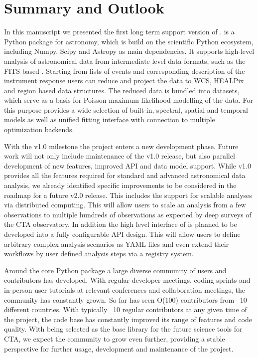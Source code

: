 \section{Summary and Outlook}
\label{sec:summary-and-outlook}

In this manuscript we presented the first long term support  version of \gammapy.
\gammapy is a Python package for \gammaray astronomy, which is build on the
scientific Python ecosystem, including Numpy, Scipy and Astropy as
main dependencies. It supports high-level analysis of astronomical \gammaray
data from intermediate level data formats, such as the FITS based
\gadf. Starting from lists of \gammaray events and corresponding description
of the instrument response users can reduce and project the data
to WCS, HEALPix and region based data structures. The reduced data is bundled
into datasets, which serve as a basis for Poisson maximum likelihood
modelling of the data. For this purpose \gammapy provides a wide selection
of built-in, spectral, spatial and temporal models as well as unified
fitting interface with connection to multiple optimization backends.

With the v1.0 milestone the \gammapy project enters a new development
phase. Future work will not only include maintenance of the v1.0 release,
but also parallel development of new features, improved API and data
model support. While v1.0 provides all the features required for
standard and advanced astronomical \gammaray data analysis,
we already identified specific improvements to be considered in the
roadmap for a future v2.0 release. This includes the support for
scalable analyses via distributed computing. This will allow
users to scale an analysis from a few observations to multiple
hundreds of observations as expected by deep surveys of the CTA
observatory. In addition the high level interface
of \gammapy is planned to be developed into a fully configurable
API design. This will allow users to define arbitrary complex analysis
scenarios as YAML files and even extend their workflows by user defined
analysis steps via a registry system.

Around the core Python package a large diverse community of
users and contributors has developed. With regular developer meetings,
coding sprints and in-person user tutorials at relevant conferences
and collaboration meetings, the community has constantly grown.
So far \gammapy has seen O(100) contributors from ~10 different countries.
With typically ~10 regular contributors at any given time of the
project, the code base has constantly improved its range of features
and code quality. With \gammapy being selected as the base library
for the future science tools for CTA, we expect the community to grow
even further, providing a stable perspective for further usage,
development and maintenance of the project.

